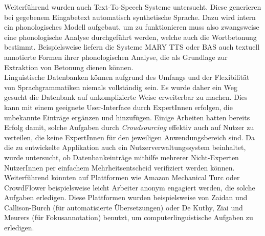 Weiterführend wurden auch Text-To-Speech Systeme untersucht. Diese generieren bei gegebenem Eingabetext automatisch synthetische Sprache. Dazu wird intern ein phonologisches Modell aufgebaut, um zu funktionieren muss also zwangsweise eine phonologische Analyse durchgeführt werden, welche auch die Wortbetonung bestimmt. Beispielsweise liefern die Systeme MARY TTS oder BAS auch textuell annotierte Formen ihrer phonologischen Analyse, die als Grundlage zur Extraktion von Betonung dienen können.\\

Linguistische Datenbanken können aufgrund des Umfangs und der Flexibilität von Sprachgrammatiken niemals vollständig sein. Es wurde daher ein Weg gesucht die Datenbank auf unkomplizierte Weise erweiterbar zu machen. Dies kann mit einem geeignete User-Interface durch ExpertInnen erfolgen, die unbekannte Einträge ergänzen und hinzufügen. Einige Arbeiten hatten bereits Erfolg damit, solche Aufgaben durch \textit{Croudsourcing} effektiv auch auf Nutzer zu verteilen, die keine ExpertInnen für den jeweiligen Anwendungsbereich sind. Da die zu entwickelte Applikation auch ein Nutzerverwaltungssystem beinhaltet, wurde untersucht, ob Datenbankeinträge mithilfe mehrerer Nicht-Experten NutzerInnen per einfachem Mehrheitsentscheid verifiziert werden können. Weiterführend könnten auf Plattformen wie Amazon Mechanical Turc oder CrowdFlower beispielsweise leicht Arbeiter anonym engagiert werden, die solche Aufgaben erledigen\cite{Snow2008}. Diese Plattformen wurden beispielsweise von Zaidan und Callison-Burch (für automatisierte Übersetzungen)\cite{Zaidan2011} oder De Kuthy, Ziai und Meurers\cite{Meurers2015} (für Fokusannotation) benutzt, um computerlinguistische Aufgaben zu erledigen.